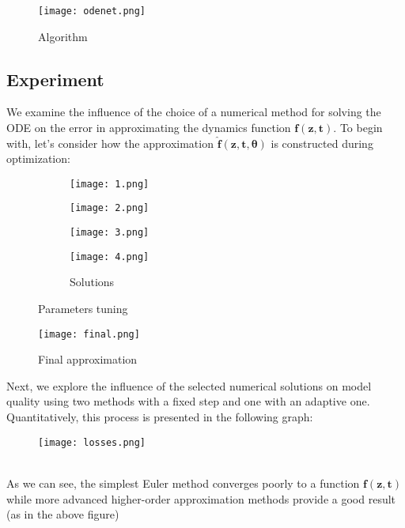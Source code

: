 \documentclass{article}
\begin{document}
\begin{figure}[h]
\centering
\texttt{[image: odenet.png]}
\caption{Algorithm \protect\footnotemark}
\end{figure}



\newpage
\subsection*{Experiment}
We examine the influence of the choice of a numerical method for solving the ODE on the error in approximating the dynamics function $\mathbf{f(z,t)}$. To begin with, let's consider how the approximation $\mathbf{\hat{f}(z, t, \theta)}$ is constructed during optimization: \\
\begin{figure}[h]
     \centering
     \begin{subfigure}[b]{0.48\textwidth}
         \centering
         \texttt{[image: 1.png]}
         \label{fig:y equals x}
     \end{subfigure}
     \hfill
     \begin{subfigure}[b]{0.48\textwidth}
         \centering
         \texttt{[image: 2.png]}
         \label{fig:three sin x}
     \end{subfigure}
     \hfill
     \begin{subfigure}[b]{0.48\textwidth}
         \centering
         \texttt{[image: 3.png]}
         \label{fig:five over x}
     \end{subfigure}
     \hfill
     \begin{subfigure}[b]{0.48\textwidth}
         \centering
         \texttt{[image: 4.png]}
         \caption{Solutions}
         \label{fig:five over x}
     \end{subfigure}
        \caption{Parameters tuning}
        \label{fig:three graphs}
\end{figure}

\begin{figure}[h]
    \centering
    \texttt{[image: final.png]}
\caption{Final approximation}
\end{figure}

\newpage
Next, we explore the influence of the selected numerical solutions on model quality using two methods with a fixed step and one with an adaptive one. Quantitatively, this process is presented in the following graph: \\
\begin{figure}[h]
\centering
\texttt{[image: losses.png]}
\caption{}
\end{figure} \\
As we can see, the simplest Euler method converges poorly to a function $\mathbf{f(z,t)}$ while more advanced higher-order approximation methods provide a good result (as in the above figure)
\end{document}
